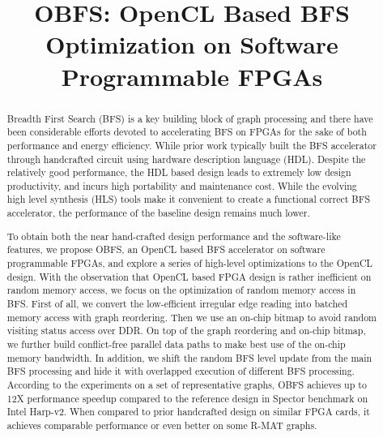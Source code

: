 \documentclass[conference]{IEEEtran}
\begin{document}
%
\title{OBFS: OpenCL Based BFS Optimization on Software Programmable FPGAs}

\maketitle

\begin{abstract}
    Breadth First Search (BFS) is a key building block of graph processing 
	and there have been considerable efforts devoted to accelerating BFS on FPGAs
	for the sake of both performance and energy efficiency. While prior work 
	typically built the BFS accelerator through handcrafted circuit using 
	hardware description language (HDL). Despite the relatively good performance, 
	the HDL based design leads to extremely low design productivity, and incurs 
	high portability and maintenance cost. While the evolving high level synthesis (HLS) 
	tools make it convenient to create a functional correct BFS accelerator, 
	the performance of the baseline design remains much lower. 

	To obtain both the near hand-crafted design performance and the software-like features, 
	we propose OBFS, an OpenCL based BFS accelerator on software programmable FPGAs, 
	and explore a series of high-level optimizations to the OpenCL design. 
	With the observation that OpenCL based FPGA design is rather inefficient on 
	random memory access, we focus on the optimization of random memory access in BFS. 
	First of all, we convert the low-efficient irregular edge reading into batched 
	memory access with graph reordering. Then we use an on-chip bitmap to avoid random 
	visiting status access over DDR. On top of the graph reordering and 
	on-chip bitmap, we further build conflict-free parallel data paths 
	to make best use of the on-chip memory bandwidth. In addition, we 
	shift the random BFS level update from the main BFS processing and 
	hide it with overlapped execution of different BFS processing. 
	According to the experiments on a set of representative graphs, 
	OBFS achieves up to 12X performance speedup compared to the reference design 
	in Spector benchmark on Intel Harp-v2. When compared to prior handcrafted design on 
	similar FPGA cards, it achieves comparable performance or even better on some R-MAT graphs. 
\end{abstract}
\end{document}
